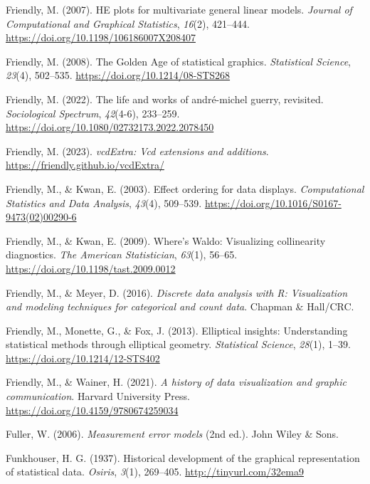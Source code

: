 \documentclass[
  letterpaper,
  10pt,
  krantz2]{krantz}
\newlength{\cslhangindent}
\newenvironment{CSLReferences}[2] %
 {\begin{list}{}{%
  \setlength{\itemindent}{0pt}
  \setlength{\leftmargin}{0pt}
  \setlength{\parsep}{0pt}
  \ifodd #1
   \setlength{\leftmargin}{\cslhangindent}
   \setlength{\itemindent}{-1\cslhangindent}
  \fi
  \setlength{\itemsep}{#2\baselineskip}}}
 {\end{list}}
\begin{document}
{\begin{CSLReferences}{1}{0}
Friendly, M. (2007). {HE} plots for multivariate general linear models.
\emph{Journal of Computational and Graphical Statistics}, \emph{16}(2),
421--444. \url{https://doi.org/10.1198/106186007X208407}

Friendly, M. (2008). The {Golden Age} of statistical graphics.
\emph{Statistical Science}, \emph{23}(4), 502--535.
\url{https://doi.org/10.1214/08-STS268}

Friendly, M. (2022). The life and works of andr{é}-michel guerry,
revisited. \emph{Sociological Spectrum}, \emph{42}(4-6), 233--259.
\url{https://doi.org/10.1080/02732173.2022.2078450}

Friendly, M. (2023). \emph{vcdExtra: Vcd extensions and additions}.
\url{https://friendly.github.io/vcdExtra/}

Friendly, M., \& Kwan, E. (2003). Effect ordering for data displays.
\emph{Computational Statistics and Data Analysis}, \emph{43}(4),
509--539. \url{https://doi.org/10.1016/S0167-9473(02)00290-6}

Friendly, M., \& Kwan, E. (2009). Where's {Waldo}: Visualizing
collinearity diagnostics. \emph{The American Statistician},
\emph{63}(1), 56--65. \url{https://doi.org/10.1198/tast.2009.0012}

Friendly, M., \& Meyer, D. (2016). \emph{Discrete data analysis with
{R}: Visualization and modeling techniques for categorical and count
data}. Chapman \& Hall/CRC.

Friendly, M., Monette, G., \& Fox, J. (2013). Elliptical insights:
Understanding statistical methods through elliptical geometry.
\emph{Statistical Science}, \emph{28}(1), 1--39.
\url{https://doi.org/10.1214/12-STS402}

Friendly, M., \& Wainer, H. (2021). \emph{A history of data
visualization and graphic communication}. Harvard University Press.
\url{https://doi.org/10.4159/9780674259034}

Fuller, W. (2006). \emph{Measurement error models} (2nd ed.). John Wiley
\& Sons.

Funkhouser, H. G. (1937). Historical development of the graphical
representation of statistical data. \emph{Osiris}, \emph{3}(1),
269--405. \url{http://tinyurl.com/32ema9}


\end{CSLReferences}}
\end{document}
